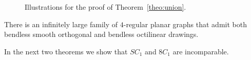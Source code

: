 \begin{figure}[t!]
	\centering
	\begin{minipage}[b]{0.45\textwidth}
		\centering
	\end{minipage}
	\hfil
	\begin{minipage}[b]{0.45\textwidth}
	\end{minipage}
	\caption{Illustrations for the proof of Theorem~\ref{theo:union}.}
\label{fig:trains}
\end{figure}

\newcommand{\union}{There is an infinitely large family of $4$-regular planar graphs that admit both bendless smooth orthogonal and bendless octilinear drawings.}
\begin{theorem}
\union
\label{theo:union}
\end{theorem}

\noindent In the next two theorems we show that $SC_1$ and $8C_1$ are incomparable.

